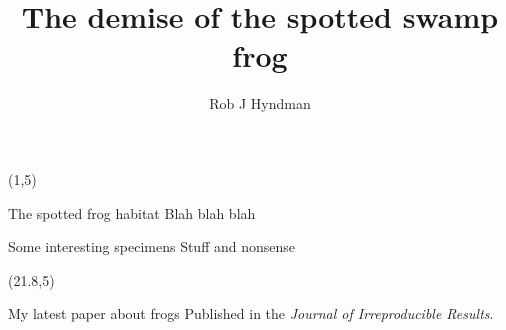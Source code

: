 \documentclass[final]{beamer}
\title{The demise of the spotted swamp frog}
\author{Rob J Hyndman}
\date{}
\begin{document}
	\begin{frame}{ }
		
			\begin{textblock}{19.5}(1,5)
				\begin{block}{The spotted frog habitat}
				Blah blah blah
			\end{block}
		
			\begin{block}{Some interesting specimens}
			Stuff and nonsense
		\end{block}
	\end{textblock}

	\begin{textblock}{19.3}(21.8,5)
		\begin{block}{My latest paper about frogs}
			Published in the \emph{Journal of Irreproducible Results}.
		\end{block}
	
	\end{textblock}

\end{frame}
\end{document}
